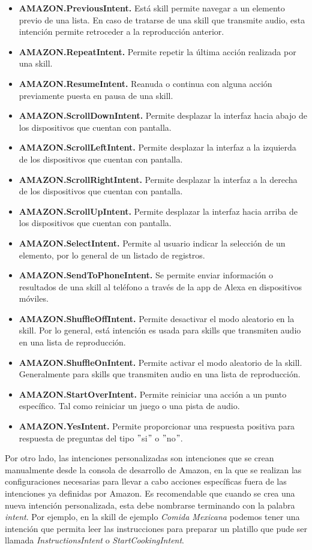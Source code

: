 \begin{itemize}
  \item \textbf{AMAZON.PreviousIntent.} Está skill permite navegar a un elemento previo de una lista. En caso de tratarse de una skill que transmite audio, esta intención permite retroceder a la reproducción anterior.
  \item \textbf{AMAZON.RepeatIntent.} Permite repetir la última acción realizada por una skill.
  \item \textbf{AMAZON.ResumeIntent.} Reanuda o continua con alguna acción previamente puesta en pausa de una skill.
  \item \textbf{AMAZON.ScrollDownIntent.} Permite desplazar la interfaz hacia abajo de los dispositivos que cuentan con pantalla.
  \item \textbf{AMAZON.ScrollLeftIntent.} Permite desplazar la interfaz a la izquierda de los dispositivos que cuentan con pantalla.
  \item \textbf{AMAZON.ScrollRightIntent.} Permite desplazar la interfaz a la derecha de los dispositivos que cuentan con pantalla.
  \item \textbf{AMAZON.ScrollUpIntent.} Permite desplazar la interfaz hacia arriba de los dispositivos que cuentan con pantalla.
  \item \textbf{AMAZON.SelectIntent.} Permite al usuario indicar la selección de un elemento, por lo general de un listado de registros.
  \item \textbf{AMAZON.SendToPhoneIntent.} Se permite enviar información o resultados de una skill al teléfono a través de la app de Alexa en dispositivos móviles.
  \item \textbf{AMAZON.ShuffleOffIntent.} Permite desactivar el modo aleatorio en la skill. Por lo general, está intención es usada para skills que transmiten audio en una lista de reproducción.
  \item \textbf{AMAZON.ShuffleOnIntent.} Permite activar el modo aleatorio de la skill. Generalmente para skills que transmiten audio en una lista de reproducción.
  \item \textbf{AMAZON.StartOverIntent.} Permite reiniciar una acción a un punto específico. Tal como reiniciar un juego o una pista de audio.
  \item \textbf{AMAZON.YesIntent.} Permite proporcionar una respuesta positiva para respuesta de preguntas del tipo $"$si$"$ o $"$no$"$.
\end{itemize}

Por otro lado, las intenciones personalizadas son intenciones que se crean manualmente desde la consola de desarrollo de Amazon, en la que se realizan las configuraciones necesarias para llevar a cabo acciones específicas fuera de las intenciones ya definidas por Amazon. Es recomendable que cuando se crea una nueva intención personalizada, esta debe nombrarse terminando con la palabra \textit{intent}. Por ejemplo, en la skill de ejemplo \textit{Comida Mexicana} podemos tener una intención que permita leer las instrucciones para preparar un platillo que pude ser llamada \textit{InstructionsIntent} o \textit{StartCookingIntent}.


